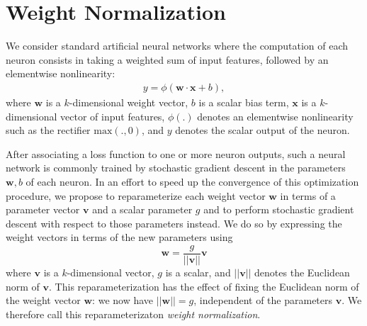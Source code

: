 \documentclass{article}
\newcommand{\bv}{\mathbf{v}}
\newcommand{\bw}{\mathbf{w}}
\begin{document}

\section{Weight Normalization}
\label{sec:weightnorm}
We consider standard artificial neural networks where the computation of each neuron consists in taking a weighted sum of input features, followed by an elementwise nonlinearity:
\begin{align}
y = \phi(\bw\cdot\mathbf{x} + b),
\end{align}
where $\bw$ is a $k$-dimensional weight vector, $b$ is a scalar bias term, $\mathbf{x}$ is a $k$-dimensional vector of input features, $\phi(.)$ denotes an elementwise nonlinearity such as the rectifier $\text{max}(., 0)$, and $y$ denotes the scalar output of the neuron.

After associating a loss function to one or more neuron outputs, such a neural network is commonly trained by stochastic gradient descent in the parameters $\bw,b$ of each neuron. In an effort to speed up the convergence of this optimization procedure, we propose to reparameterize each weight vector $\bw$ in terms of a parameter vector $\bv$ and a scalar parameter $g$ and to perform stochastic gradient descent with respect to those parameters instead. We do so by expressing the weight vectors in terms of the new parameters using
\begin{equation}
\label{eq:weight_norm}
\bw = \frac{g}{||\bv||}\bv
\end{equation}
where $\bv$ is a $k$-dimensional vector, $g$ is a scalar, and $||\bv||$ denotes the Euclidean norm of $\bv$. This reparameterization has the effect of fixing the Euclidean norm of the weight vector $\bw$: we now have $||\bw|| = g$, independent of the parameters $\bv$. We therefore call this reparameterizaton \emph{weight normalization}.
\end{document}
